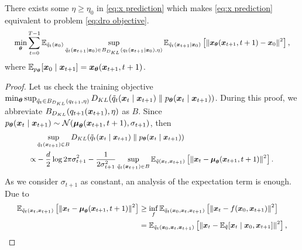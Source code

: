 \begin{lemma}\label{lemma:equivalence}
    There exists some $\eta \geq \eta_{0}$ in  \eqref{eq:x prediction} which makes \eqref{eq:x prediction} equivalent to problem \eqref{eq:dro objective}. 
    \begin{equation}\label{eq:x prediction}
    \small
    \min_{\boldsymbol{\theta}}\sum_{t=0}^{T - 1}\mathbb{E}_{\tilde{q}_{t}(\boldsymbol{x}_{0})}\sup_{\tilde{q}_{t}(\boldsymbol{x}_{t + 1}\mid \boldsymbol{x}_{0})\in B_{D_{KL}}(q_{t}(\boldsymbol{x}_{t + 1}\mid \boldsymbol{x}_{0}), \eta)}\mathbb{E}_{\tilde{q}_{t}(\boldsymbol{x}_{t + 1}\mid \boldsymbol{x}_{0})}\left[\left\|\boldsymbol{x}_{\boldsymbol{\theta}}(\boldsymbol{x}_{t + 1}, t + 1) - \boldsymbol{x}_{0}\right\|^{2}\right],
\end{equation}
where $\mathbb{E}_{p_{\boldsymbol{\theta}}}[\boldsymbol{x}_{0}\mid \boldsymbol{x}_{t + 1}] = \boldsymbol{x}_{\boldsymbol{\theta}}(\boldsymbol{x}_{t + 1}, t + 1)$.
\end{lemma}

\begin{proof}
	Let us check the training objective $\min_{\boldsymbol{\theta}}\sup_{\tilde{q}_{t}\in B_{D_{KL}}(q_{t + 1}, \eta)}D_{KL}(\tilde{q}_{t}(\boldsymbol{x}_{t}\mid \boldsymbol{x}_{t + 1})\parallel p_{\boldsymbol{\theta}}(\boldsymbol{x}_{t}\mid \boldsymbol{x}_{t + 1}))$. During this proof, we abbreviate $B_{D_{KL}}(q_{t + 1}(\boldsymbol{x}_{t + 1}), \eta)$ as $B$. Since $p_{\boldsymbol{\theta}}(\boldsymbol{x}_{t}\mid \boldsymbol{x}_{t + 1})\sim \mathcal{N}(\text{\boldmath{$\mu$}}_{\boldsymbol{\theta}}(\boldsymbol{x}_{t + 1}, t + 1), \sigma_{t + 1})$, then 
	\begin{equation}
		\small
		\begin{aligned}
			&\sup_{\tilde{q}_{t}(\boldsymbol{x}_{t + 1})\in B} D_{KL}(\tilde{q}_{t}(\boldsymbol{x}_{t}\mid \boldsymbol{x}_{t + 1})\parallel p_{\boldsymbol{\theta}}(\boldsymbol{x}_{t}\mid \boldsymbol{x}_{t + 1}))\\
             \propto &-\frac{d}{2}\log{2\pi\sigma_{t + 1}^{2}}
			 - \frac{1}{2\sigma_{t + 1}^{2}}\sup_{\tilde{q}_{t}(\boldsymbol{x}_{t + 1})\in B}\mathbb{E}_{\tilde{q}(\boldsymbol{x}_{t}, \boldsymbol{x}_{t + 1})}\left[\left\|\boldsymbol{x}_{t} - \text{\boldmath{$\mu$}}_{\boldsymbol{\theta}}(\boldsymbol{x}_{t + 1}, t + 1)\right\|^{2}\right].\\ 
		\end{aligned} 
	\end{equation}
	As we consider $\sigma_{t + 1}$ as constant, an analysis of the expectation term is enough. Due to 
	\begin{equation}\label{eq:lower bound}
		\small
		\begin{aligned}
			\mE_{\tq_{t}(\bx_{t}, \bx_{t + 1})}\left[\left\|\bx_{t} - \bmu_{\btheta}(\bx_{t + 1}, t + 1)\right\|^{2}\right] & \geq \inf_{f}\mE_{\tq_{t}(\bx_{0}, \bx_{t}, \bx_{t + 1})}\left[\left\|\bx_{t} - f(\bx_{0}, \bx_{t+1})\right\|^{2}\right]\\
			 & = \mE_{\tq_{t}(\bx_{0}, \bx_{t}, \bx_{t + 1})}\left[\left\|\bx_{t} - \mE_{\tq}[\bx_{t}\mid \bx_{0}, \bx_{t + 1}]\right\|^{2}\right],

\end{aligned}
\end{equation}
\end{proof}
